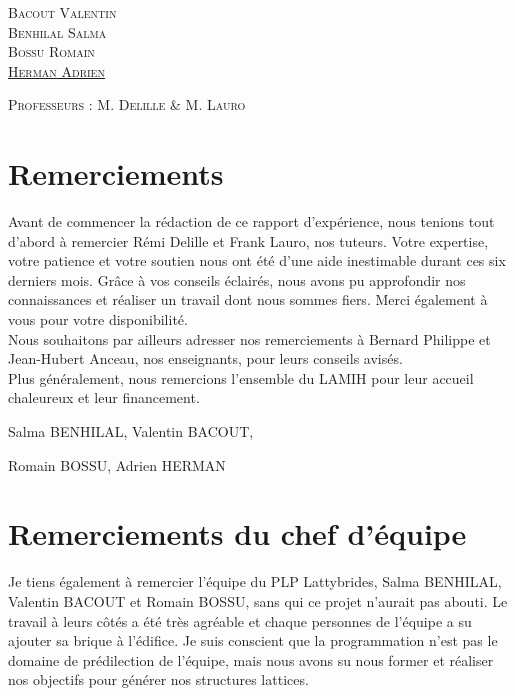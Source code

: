 \documentclass[a4paper]{article}
\begin{document}
\begin{titlepage}
\begin{center}
			\begin{minipage}{1\textwidth}\large
				\textsc{Bacout Valentin}\\
				\textsc{Benhilal Salma}\\
				\textsc{Bossu Romain}\\
				\textsc{\underline{Herman Adrien}}
				\begin{flushright}
				\textsc{{Professeurs : M. Delille \& M. Lauro}}
				\end{flushright}
			\end{minipage}
		\end{center}
	\end{titlepage}
	
	\section*{Remerciements}
	
	\hspace{0.5cm}Avant de commencer la rédaction de ce rapport d'expérience, nous tenions tout d’abord à remercier Rémi Delille et Frank Lauro, nos tuteurs. Votre expertise, votre patience et votre soutien nous ont été d'une aide inestimable durant ces six derniers mois. Grâce à vos conseils éclairés, nous avons pu approfondir nos connaissances et réaliser un travail dont nous sommes fiers. Merci également à vous pour votre disponibilité.\\
	
	Nous souhaitons par ailleurs adresser nos remerciements à Bernard Philippe et Jean-Hubert Anceau, nos enseignants, pour leurs conseils avisés.\\
	
	Plus généralement, nous remercions l’ensemble du LAMIH pour leur accueil chaleureux et leur financement.\\
	
	\begin{flushright}
		Salma BENHILAL, Valentin BACOUT,
		
		Romain BOSSU, Adrien HERMAN
	\end{flushright}
	
	\section*{Remerciements du chef d'équipe}
	
	\hspace{0.5cm}Je tiens également à remercier l'équipe du PLP Lattybrides, Salma BENHILAL, Valentin BACOUT et Romain BOSSU, sans qui ce projet n'aurait pas abouti. Le travail à leurs côtés a été très agréable et chaque personnes de l'équipe a su ajouter sa brique à l'édifice. Je suis conscient que la programmation n'est pas le domaine de prédilection de l'équipe, mais nous avons su nous former et réaliser nos objectifs pour générer nos structures lattices.\\
	
\end{document}
